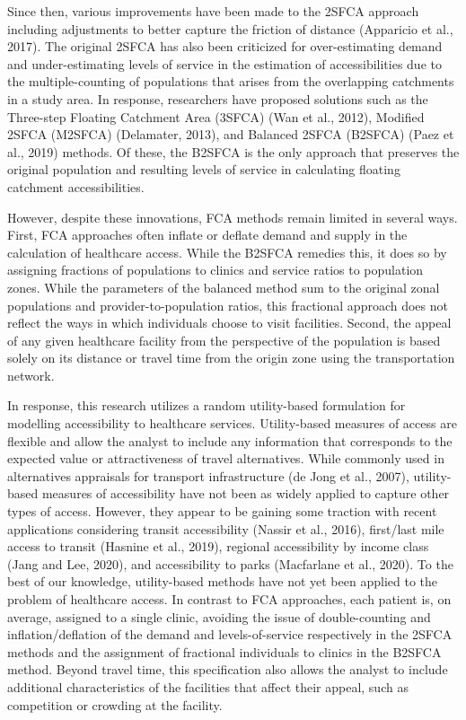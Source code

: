 \documentclass[]{elsarticle} %
\begin{document}
Since then, various improvements have been made to the 2SFCA approach
including adjustments to better capture the friction of distance
(Apparicio et al., 2017). The original 2SFCA has also been criticized
for over-estimating demand and under-estimating levels of service in the
estimation of accessibilities due to the multiple-counting of
populations that arises from the overlapping catchments in a study area.
In response, researchers have proposed solutions such as the Three-step
Floating Catchment Area (3SFCA) (Wan et al., 2012), Modified 2SFCA
(M2SFCA) (Delamater, 2013), and Balanced 2SFCA (B2SFCA) (Paez et al.,
2019) methods. Of these, the B2SFCA is the only approach that preserves
the original population and resulting levels of service in calculating
floating catchment accessibilities.

However, despite these innovations, FCA methods remain limited in
several ways. First, FCA approaches often inflate or deflate demand and
supply in the calculation of healthcare access. While the B2SFCA
remedies this, it does so by assigning fractions of populations to
clinics and service ratios to population zones. While the parameters of
the balanced method sum to the original zonal populations and
provider-to-population ratios, this fractional approach does not reflect
the ways in which individuals choose to visit facilities. Second, the
appeal of any given healthcare facility from the perspective of the
population is based solely on its distance or travel time from the
origin zone using the transportation network.

In response, this research utilizes a random utility-based formulation
for modelling accessibility to healthcare services. Utility-based
measures of access are flexible and allow the analyst to include any
information that corresponds to the expected value or attractiveness of
travel alternatives. While commonly used in alternatives appraisals for
transport infrastructure (de Jong et al., 2007), utility-based measures
of accessibility have not been as widely applied to capture other types
of access. However, they appear to be gaining some traction with recent
applications considering transit accessibility (Nassir et al., 2016),
first/last mile access to transit (Hasnine et al., 2019), regional
accessibility by income class (Jang and Lee, 2020), and accessibility to
parks (Macfarlane et al., 2020). To the best of our knowledge,
utility-based methods have not yet been applied to the problem of
healthcare access. In contrast to FCA approaches, each patient is, on
average, assigned to a single clinic, avoiding the issue of
double-counting and inflation/deflation of the demand and
levels-of-service respectively in the 2SFCA methods and the assignment
of fractional individuals to clinics in the B2SFCA method. Beyond travel
time, this specification also allows the analyst to include additional
characteristics of the facilities that affect their appeal, such as
competition or crowding at the facility.
\end{document}
